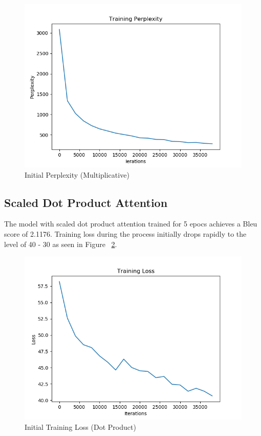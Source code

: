 \documentclass[11pt,a4paper]{article}
\begin{document}
\begin{figure}[!htbp]
\includegraphics[width=\linewidth]{hi_mul_ppl_1.png}
\caption{Initial Perplexity (Multiplicative)}
\label{fig3}
\end{figure}


\subsection{Scaled Dot Product Attention}
The model with scaled dot product attention trained for 5 epocs achieves a Bleu score of 2.1176.
Training loss during the process initially drops rapidly to the level of 40 - 30 as seen in Figure ~\ref{fig5}.

\begin{figure}[!htbp]
\includegraphics[width=\linewidth]{hi_dot_loss_1.png}
\caption{Initial Training Loss (Dot Product)}
\label{fig5}
\end{figure}
\end{document}
